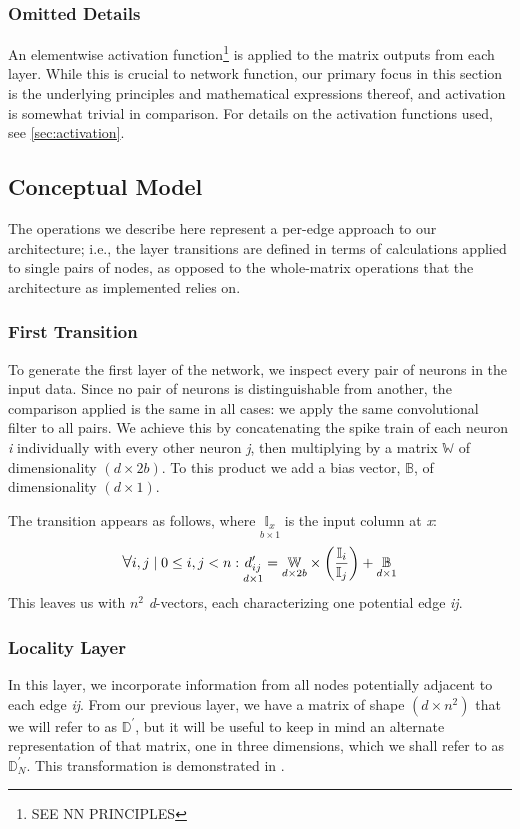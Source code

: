 \subsubsection{Omitted Details}
An elementwise activation function\footnote{SEE NN PRINCIPLES} is applied to the 
matrix outputs from each layer. While this is crucial to network function, our 
primary focus in this section is the underlying principles and mathematical 
expressions thereof, and activation is somewhat trivial in comparison. For 
details on the activation functions used, see \ref{sec:activation}.

\subsection{Conceptual Model}
\label{subsec:conceptualmodel}
The operations we describe here represent a per-edge approach to our 
architecture; i.e., the layer transitions are defined in terms of calculations 
applied to single pairs of nodes, as opposed to the whole-matrix operations that 
the architecture as implemented relies on.

\subsubsection{First Transition}
To generate the first layer of the network, we inspect every pair of neurons in 
the input data. Since no pair of neurons is distinguishable from another, the 
comparison applied is the same in all cases: we apply the same convolutional 
filter to all pairs. We achieve this by concatenating the spike train of each 
neuron \textit{i} individually with every other neuron \textit{j}, then 
multiplying by a matrix $\mathbb{W}$ of dimensionality $(d \times 2b)$. To this 
product we add a bias vector, $\mathbb{B}$, of dimensionality $(d \times 1)$.

The transition appears as follows, where $\underset{b \times 1}{\mathbb{I}_x}$ 
is the input column at \textit{x}:
\[
	\mathlarger\forall i,j \mid 0 \leq i,j < n: \underset{d \times 
	1}{d_{ij}^\prime} = \underset{d \times 2b}{\mathbb{W}} \times 
	\left(\frac{\mathbb{I}_i}{\mathbb{I}_j}\right) + \underset{d \times 
	1}{\mathbb{B}}
\]
This leaves us with $n^2$ \textit{d}-vectors, each characterizing one potential 
edge \textit{ij}.

\subsubsection{Locality Layer}
\label{subsubsec:locality}
In this layer, we incorporate information from all nodes potentially adjacent to 
each edge \textit{ij}. From our previous layer, we have a matrix of shape $(d 
\times n^2)$ that we will refer to as $\mathbb{D}^{\prime}$, but it will be 
useful to keep in mind an alternate representation of that matrix, one in three 
dimensions, which we shall refer to as $\mathbb{D}_N^{\prime}$. This 
transformation is demonstrated in .

